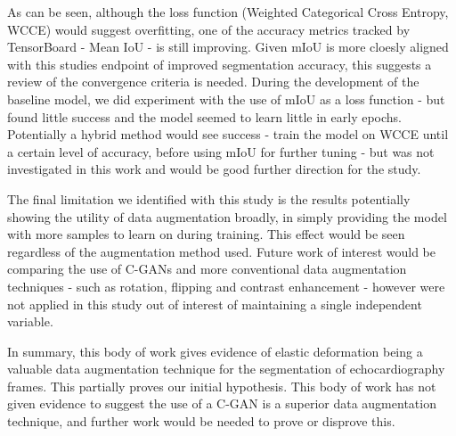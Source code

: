 As can be seen, although the loss function (Weighted Categorical Cross Entropy,
WCCE) would suggest overfitting, one of the accuracy metrics tracked by
TensorBoard - Mean IoU - is still improving. Given mIoU is more cloesly aligned
with this studies endpoint of improved segmentation accuracy, this suggests a
review of the convergence criteria is needed. During the development of the
baseline model, we did experiment with the use of mIoU as a loss function - but
found little success and the model seemed to learn little in early epochs.
Potentially a hybrid method would see success - train the model on WCCE until a
certain level of accuracy, before using mIoU for further tuning - but was not
investigated in this work and would be good further direction for the study.
\newline

The final limitation we identified with this study is the results potentially
showing the utility of data augmentation broadly, in simply providing the model
with more samples to learn on during training. This effect would be seen
regardless of the augmentation method used. Future work of interest would be
comparing the use of C-GANs and more conventional data augmentation techniques -
such as rotation, flipping and contrast enhancement - however were not applied
in this study out of interest of maintaining a single independent variable.
\newline

In summary, this body of work gives evidence of elastic deformation being a valuable
data augmentation technique for the segmentation of echocardiography frames.
This partially proves our initial hypothesis. This body of work has not given
evidence to suggest the use of a C-GAN is a superior data augmentation
technique, and further work would be needed to prove or disprove this. \newline